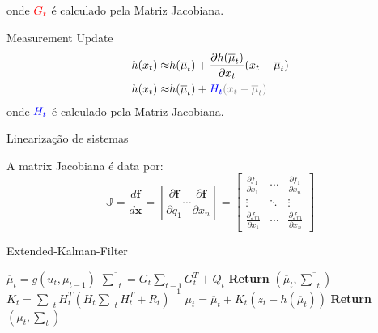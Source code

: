 onde $\color{red}G_t$ é calculado pela Matriz Jacobiana.

Measurement Update
\begin{equation*}
    \begin{split}
        h(x_t) \approx & h(\overline{\mu}_t) + \frac{\partial h(\overline{\mu}_t) }{\partial x_{t}}(x_{t}-\overline{\mu}_{t}) \\
        h(x_t) \approx & h(\overline{\mu}_t) + \color{blue}{H_t}\color{gray}{(x_{t}-\overline{\mu}_{t})}
    \end{split}
\end{equation*}
onde $\color{blue}H_t$ é calculado pela Matriz Jacobiana.


Linearização de sistemas

A matrix Jacobiana é data por:
\begin{equation*}
    \mathbb{J}
    =
    \frac{d \mathbf{f}}{d \mathbf{x}}
    =
    \left[ \frac{\partial \mathbf{f}}{\partial q_1}
        \cdots \frac{\partial \mathbf{f}}{\partial x_n} \right]
    =
    \begin{bmatrix}
        \frac{\partial f_1}{\partial x_1} & \cdots &
        \frac{\partial f_1}{\partial x_n}                   \\
        \vdots                            & \ddots & \vdots \\
        \frac{\partial f_m}{\partial x_1} & \cdots &
        \frac{\partial f_m}{\partial x_n}
    \end{bmatrix}
\end{equation*}


\begin{algorithm}[H]
    \caption{Extended-Kalman-Filter}
    \begin{algorithmic}[1]
        \State $\overline{\mu}_t = g(u_t, \mu_{t-1})$
        \State $ \overline{\textstyle\sum}_t = G_t {\textstyle\sum}_{t-1} G_t^T+ Q_t$ 
        \State \textbf{Return} $\left(\overline{\mu}_t, \overline{\textstyle\sum}_t\right)$
    \EndProcedure
        \State $K_t = \overline{\textstyle\sum}_tH_t^T(H_t\overline{\textstyle\sum}_tH_t^T+R_t)^{-1}$
        \State $\mu_t  = \overline{\mu}_t + K_t(z_t -h(\overline\mu_t))$
        \State \textbf{Return} $\left(\mu_t, \textstyle\sum_t\right)$
    \EndProcedure
    \end{algorithmic}
\end{algorithm}


